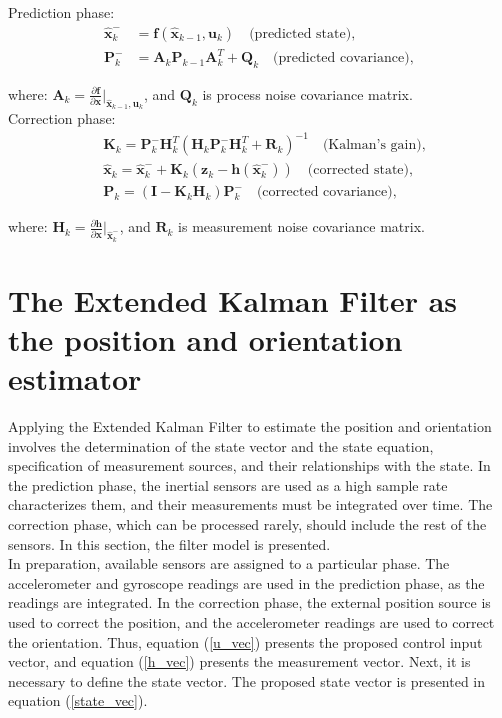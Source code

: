 Prediction phase:
\begin{align}
	\bm{\hat{x}}_k^- & = \bm{f}(\bm{\hat{x}}_{k-1}, \bm{u}_k) \quad \text{(predicted state)}, \\
	\bm{P}_k^- & = \bm{A}_k \bm{P}_{k-1} \bm{A}_k^T + \bm{Q}_k \quad \text{(predicted covariance)},
\end{align}

where: $\bm{A}_k = \frac{\partial \bm{f}}{\partial \bm{x}}\Bigr|_{\bm{\hat{x}}_{k-1}, \bm{u}_k}$, and $\bm{Q}_k$ is process noise covariance matrix.\\

Correction phase:
\begin{align}
	&\bm{K}_k = \bm{P}_k^- \bm{H}_k^T (\bm{H}_k \bm{P}_k^- \bm{H}_k^T + \bm{R}_k)^{-1} \quad \text{(Kalman's gain)}, \\
	&\bm{\hat{x}}_k = \bm{\hat{x}}_k^- + \bm{K}_k(\bm{\bm{z}}_k - \bm{h}(\bm{\hat{x}}_k^-)) \quad \text{(corrected state)}, \\
	&\bm{P}_k = (\bm{I} - \bm{K}_k \bm{H}_k) \bm{P}_k^- \quad \text{(corrected covariance)},
\end{align}

where: $\bm{H}_k = \frac{\partial \bm{h}}{\partial \bm{x}}\Bigr|_{\bm{\hat{x}}_k^-}$, and $\bm{R}_k$ is measurement noise covariance matrix.



\section{The  Extended Kalman Filter as the position and orientation estimator}
\label{filter_model}

Applying the Extended Kalman Filter to estimate the position and orientation involves the determination of the state vector and the state equation, specification of measurement sources, and their relationships with the state. In the prediction phase, the inertial sensors are used as a high sample rate characterizes them, and their measurements must be integrated over time. The correction phase, which can be processed rarely, should include the rest of the sensors. In this section, the filter model is presented.\\

In preparation, available sensors are assigned to a particular phase. The accelerometer and gyroscope readings are used in the prediction phase, as the readings are integrated. In the correction phase, the external position source is used to correct the position, and the accelerometer readings are used to correct the orientation. Thus, equation (\ref{u_vec}) presents the proposed control input vector, and equation (\ref{h_vec}) presents the measurement vector. Next, it is necessary to define the state vector. The proposed state vector is presented in equation (\ref{state_vec}).

